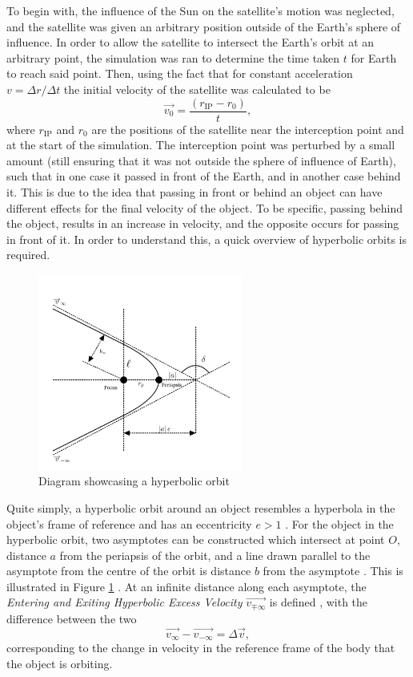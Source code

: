 \documentclass[11pt, english]{report}
\begin{document}
{To begin with, the influence of the Sun on the satellite's motion was neglected, and the satellite was given an arbitrary position outside of the Earth's sphere of influence. In order to allow the satellite to intersect the Earth's orbit at an arbitrary point, the simulation was ran to determine the time taken $t$ for Earth to reach said point. Then, using the fact that for constant acceleration $v = \Delta r / \Delta t$ \cite{newton_principia_1999} the initial velocity of the satellite was calculated to be 
\begin{equation}
    \vec{v_0} = \frac{(r_{\mathrm{IP}} - r_0)}{t},
\end{equation}
where $r_{\mathrm{IP}}$ and $r_0$ are the positions of the satellite near the interception point and at the start of the simulation. The interception point was perturbed by a small amount (still ensuring that it was not outside the sphere of influence of Earth), such that in one case it passed in front of the Earth, and in another case behind it. This is due to the idea that passing in front or behind an object can have different effects for the final velocity of the object. To be specific, passing behind the object, results in an increase in velocity, and the opposite occurs for passing in front of it. In order to understand this, a quick overview of hyperbolic orbits is required.
\begin{figure}[ht]
    \centering
    \includegraphics[width=0.6\textwidth]{graphics/Orbits.jpg}
    \caption{Diagram showcasing a hyperbolic orbit}
    \label{fig:hyp_orbit}
\end{figure}

Quite simply, a hyperbolic orbit around an object resembles a hyperbola in the object's frame of reference and has an eccentricity $e > 1$ \cite{kluever_spaceflight_2003}. For the object in the hyperbolic orbit, two asymptotes can be constructed which intersect at point $O$, distance $a$ from the periapsis of the orbit, and a line drawn parallel to the asymptote from the centre of the orbit is distance $b$ from the asymptote . This is illustrated in Figure \ref{fig:hyp_orbit} . At an infinite distance along each asymptote, the \emph{Entering and Exiting Hyperbolic Excess Velocity} $\vec{v_{\mp \infty}}$ is defined , with the difference between the two
\begin{equation} 
    \vec{v_{\infty}} - \vec{v_{-\infty}} = \Delta \vec{v},
\end{equation}
corresponding to the change in velocity in the reference frame of the body that the object is orbiting. 
}
\end{document}
